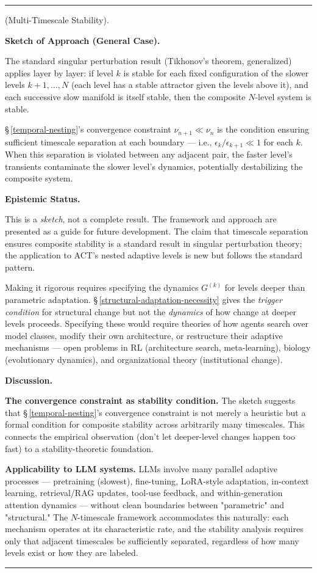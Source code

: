 \documentclass[11pt,oneside]{article}
\newcounter{claim}[section]
\renewcommand{\theclaim}{\thesection.\arabic{claim}}
\newenvironment{segment}[2]{%
  \refstepcounter{claim}%
  \bigskip\noindent\hrule\smallskip
  \noindent{\bfseries #1~\theclaim}\enskip(#2).\par\smallskip
  \noindent\ignorespaces
}{%
  \par\smallskip\noindent\hrule\bigskip
}
\newenvironment{sketch}[1][]{\begin{segment}{Sketch}{#1}}{\end{segment}}
\begin{document}
\begin{sketch}[Multi-Timescale Stability]
\medskip\noindent\textbf{Sketch of Approach (General Case).}


The standard singular perturbation result (Tikhonov's theorem, generalized) applies layer by layer: if level $k$ is stable for each fixed configuration of the slower levels $k+1, \ldots, N$ (each level has a stable attractor given the levels above it), and each successive slow manifold is itself stable, then the composite $N$-level system is stable.

\S\,\ref{temporal-nesting}'s convergence constraint $\nu_{n+1} \ll \nu_n$ is the condition ensuring sufficient timescale separation at each boundary — i.e., $\epsilon_k / \epsilon_{k+1} \ll 1$ for each $k$. When this separation is violated between any adjacent pair, the faster level's transients contaminate the slower level's dynamics, potentially destabilizing the composite system.


\medskip\noindent\textbf{Epistemic Status.}


This is a \textit{sketch}, not a complete result. The framework and approach are presented as a guide for future development. The claim that timescale separation ensures composite stability is a standard result in singular perturbation theory; the application to ACT's nested adaptive levels is new but follows the standard pattern.

Making it rigorous requires specifying the dynamics $G^{(k)}$ for levels deeper than parametric adaptation. \S\,\ref{structural-adaptation-necessity} gives the \textit{trigger condition} for structural change but not the \textit{dynamics} of how change at deeper levels proceeds. Specifying these would require theories of how agents search over model classes, modify their own architecture, or restructure their adaptive mechanisms — open problems in RL (architecture search, meta-learning), biology (evolutionary dynamics), and organizational theory (institutional change).


\medskip\noindent\textbf{Discussion.}


\textbf{The convergence constraint as stability condition.} The sketch suggests that \S\,\ref{temporal-nesting}'s convergence constraint is not merely a heuristic but a formal condition for composite stability across arbitrarily many timescales. This connects the empirical observation (don't let deeper-level changes happen too fast) to a stability-theoretic foundation.

\textbf{Applicability to LLM systems.} LLMs involve many parallel adaptive processes — pretraining (slowest), fine-tuning, LoRA-style adaptation, in-context learning, retrieval/RAG updates, tool-use feedback, and within-generation attention dynamics — without clean boundaries between "parametric" and "structural." The $N$-timescale framework accommodates this naturally: each mechanism operates at its characteristic rate, and the stability analysis requires only that adjacent timescales be sufficiently separated, regardless of how many levels exist or how they are labeled.

\end{sketch}
\end{document}
